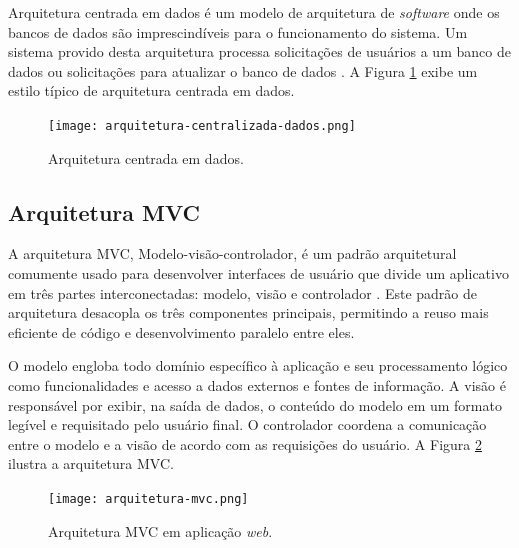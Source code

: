 Arquitetura centrada em dados é um modelo de arquitetura de \textit{software} onde os bancos de dados são imprescindíveis para o funcionamento do sistema. Um sistema provido desta arquitetura processa solicitações de usuários a um banco de dados ou solicitações para atualizar o banco de dados \cite{lewisBook}. A Figura \ref{dataCenteredArchitecture} exibe um estilo típico de arquitetura centrada em dados.

\begin{figure}[ht]
    \caption{Arquitetura centrada em dados.}
       	\begin{center}
            \texttt{[image: arquitetura-centralizada-dados.png]}
        \end{center}
    \label{dataCenteredArchitecture}
\end{figure}


\subsection{Arquitetura MVC}
\label{arquiteturaMVC}

A arquitetura MVC, Modelo-visão-controlador, é um padrão arquitetural comumente usado para desenvolver interfaces de usuário que divide um aplicativo em três partes interconectadas: modelo, visão e controlador \cite{mvcCookbook}. Este padrão de arquitetura desacopla os três componentes principais, permitindo a reuso mais eficiente de código e desenvolvimento paralelo entre eles. 

O modelo engloba todo domínio específico à aplicação e seu processamento lógico como funcionalidades e acesso a dados externos e fontes de informação. A visão é responsável por exibir, na saída de dados, o conteúdo do modelo em um formato legível e requisitado pelo usuário final. O controlador coordena a comunicação entre o modelo e a visão de acordo com as requisições do usuário. A Figura \ref{dataMVCArchitecture} ilustra a arquitetura MVC.

\begin{figure}[ht]
    \caption{Arquitetura MVC em aplicação \textit{web}.}
       	\begin{center}
            \texttt{[image: arquitetura-mvc.png]}
        \end{center}
    \label{dataMVCArchitecture}
\end{figure}


